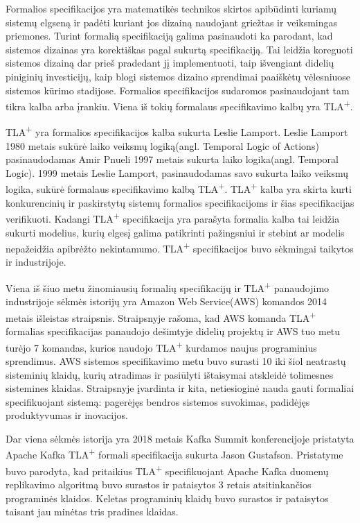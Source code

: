 \documentclass{VUMIFPSmagistrinis}
\begin{document}
		Formalios specifikacijos yra matematikės technikos skirtos apibūdinti kuriamų sistemų elgseną ir padėti kuriant jos dizainą naudojant griežtas ir veiksmingas priemones.
		Turint formalią specifikaciją galima pasinaudoti ka parodant, kad sistemos dizainas yra korektiškas pagal sukurtą specifikaciją.
		Tai leidžia koreguoti sistemos dizainą dar prieš pradedant jį implementuoti, taip išvengiant didelių piniginių investicijų, kaip blogi sistemos dizaino sprendimai paaiškėtų vėlesniuose sistemos kūrimo stadijose.
		Formalios specifikacijos sudaromos pasinaudojant tam tikra kalba arba įrankiu.
		Viena iš tokių formalaus specifikavimo kalbų yra TLA\textsuperscript{+}.
		

		TLA\textsuperscript{+} yra formalios specifikacijos kalba sukurta Leslie Lamport.
		Leslie Lamport 1980 metais sukūrė laiko veiksmų logiką(angl. Temporal Logic of Actions) pasinaudodamas Amir Pnueli 1997 metais sukurta laiko logika(angl. Temporal Logic).
		1999 metais Leslie Lamport, pasinaudodamas savo sukurta laiko veiksmų logika, sukūrė formalaus specifikavimo kalbą TLA\textsuperscript{+}.
		TLA\textsuperscript{+} kalba yra skirta kurti konkurencinių ir paskirstytų sistemų formalios specifikacijoms ir šias specifikacijas verifikuoti.
		Kadangi TLA\textsuperscript{+} specifikacija yra parašyta formalia kalba tai leidžia sukurti modelius, kurių elgesį galima patikrinti pažingsniui ir stebint ar modelis nepažeidžia apibrėžto nekintamumo.
		TLA\textsuperscript{+} specifikacijos buvo sėkmingai taikytos ir industrijoje.


		Viena iš šiuo metu žinomiausių formalių specifikacijų ir TLA\textsuperscript{+} panaudojimo industrijoje sėkmės istorijų yra Amazon Web Service(AWS) komandos 2014 metais išleistas straipsnis.
		Straipsnyje rašoma,  kad AWS komanda TLA\textsuperscript{+} formalias specifikacijas panaudojo dešimtyje didelių projektų ir AWS tuo metu turėjo 7 komandas, kurios naudojo TLA\textsuperscript{+} kurdamos naujus programinius sprendimus.
		AWS sistemos specifikavimo metu buvo surasti 10 iki šiol neatrastų sisteminių klaidų, kurių atradimas ir pasiūlyti ištaisymai atskleidė tolimesnes sistemines klaidas.
		Straipsnyje įvardinta ir kita, netiesioginė nauda gauti formaliai specifikuojant sistemą: pagerėjęs bendros sistemos suvokimas, padidėjęs produktyvumas ir inovacijos.
		

		Dar viena sėkmės istorija yra 2018 metais Kafka Summit konferencijoje pristatyta Apache Kafka TLA\textsuperscript{+} formali specifikacija sukurta Jason Gustafson.
		Pristatyme buvo parodyta, kad pritaikius TLA\textsuperscript{+} specifikuojant Apache Kafka duomenų replikavimo algoritmą buvo surastos ir pataisytos 3 retais atsitinkančios programinės klaidos.
		Keletas programinių klaidų buvo surastos ir pataisytos taisant jau minėtas tris pradines klaidas.
\end{document}
